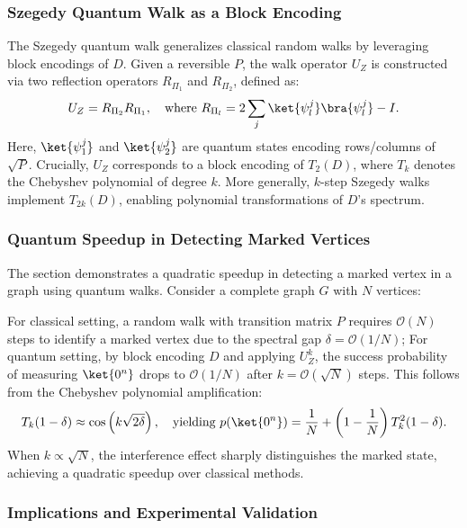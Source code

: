 \documentclass{article}
\begin{document}
\subsubsection{Szegedy Quantum Walk as a Block Encoding}
The Szegedy quantum walk generalizes classical random walks by leveraging block encodings of $ D $. Given a reversible $ P $, the walk operator $ U_Z $ is constructed via two reflection operators $ R_{\Pi_1} $ and $ R_{\Pi_2} $, defined as:
\begin{equation}
U_Z = R_{\Pi_2} R_{\Pi_1}, \quad \text{where } R_{\Pi_l} = 2 \sum_j \ket{\psi_l^j}\bra{\psi_l^j} - I.
\end{equation}
Here, $ \ket{\psi_1^j} $ and $ \ket{\psi_2^j} $ are quantum states encoding rows/columns of $ \sqrt{P} $. Crucially, $ U_Z $ corresponds to a block encoding of $ T_2(D) $, where $ T_k $ denotes the Chebyshev polynomial of degree $ k $. More generally, $ k $-step Szegedy walks implement $ T_{2k}(D) $, enabling polynomial transformations of $ D $'s spectrum.

\subsubsection{Quantum Speedup in Detecting Marked Vertices}
The section demonstrates a quadratic speedup in detecting a marked vertex in a graph using quantum walks. Consider a complete graph $ G $ with $ N $ vertices:

For classical setting, a random walk with transition matrix $ P $ requires $ \mathcal{O}(N) $ steps to identify a marked vertex due to the spectral gap $ \delta = \mathcal{O}(1/N) $; For quantum setting, by block encoding $ D $ and applying $ U_Z^k $, the success probability of measuring $ \ket{0^n} $ drops to $ \mathcal{O}(1/N) $ after $ k = \mathcal{O}(\sqrt{N}) $ steps. This follows from the Chebyshev polynomial amplification:
\begin{equation}
T_k(1 - \delta) \approx \cos\left(k \sqrt{2\delta}\right), \quad \text{yielding } p(\ket{0^n}) = \frac{1}{N} + \left(1 - \frac{1}{N}\right) T_k^2(1 - \delta).
\end{equation}
When $ k \propto \sqrt{N} $, the interference effect sharply distinguishes the marked state, achieving a quadratic speedup over classical methods.

\subsubsection{Implications and Experimental Validation}
\end{document}
